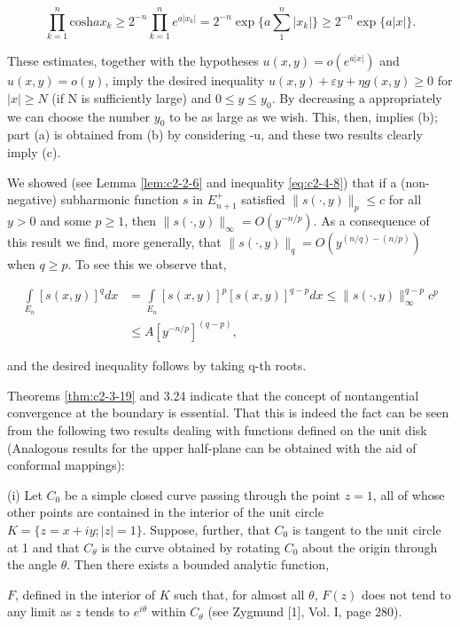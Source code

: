 \[
\prod_{k=1}^{n}\text{cosh}a x_{k}\geq2^{-n}\prod_{k=1}^{n}e^{a|x_{k}|}=2^{-n}\exp\bigg\{a\sum_{1}^{n}|x_{k}|\bigg\}\geq2^{-n}\exp\{a|x|\}.
\]

These estimates, together with the hypotheses $u(x, y) = o(e^{a|x|})$ and $u(x, y) = o(y)$, imply the desired inequality $u(x, y) + \varepsilon y + \eta g(x, y) \geq 0$ for $|x| \geq N$ (if N is sufficiently large) and $0 \leq y \leq y_0$. By decreasing a appropriately we can choose the number $y_0$ to be as large as we wish. This, then, implies (b); part (a) is obtained from (b) by considering -u, and these two results clearly imply (c).

 We showed (see Lemma \ref{lem:c2-2-6} and inequality \eqref{eq:c2-4-8}) that if a (non-negative) subharmonic function $s$ in $E_{n+1}^+$ satisfied $\|s(\cdot, y)\|_p \leq c$ for all $y > 0$ and some $p \geq 1$, then $\|s(\cdot, y)\|_{\infty} = O(y^{-n/p})$. As a consequence of this result we find, more generally, that $\|s(\cdot, y)\|_q = O(y^{(n/q) - (n/p)})$ when $q \geq p$. To see this we observe that,

\[
\begin{aligned}\int\limits_{E_{n}}[s(x,y)]^{q} dx&=\int\limits_{E_{n}}[s(x,y)]^{p}[s(x,y)]^{q-p}dx\leq\|s(\cdot,y)\|_{\infty}^{q-p}c^{p}\\&\leq A[y^{-n/p}]^{(q-p)},\end{aligned}
\]

and the desired inequality follows by taking q-th roots.

 Theorems \ref{thm:c2-3-19} and 3.24 indicate that the concept of nontangential convergence at the boundary is essential. That this is indeed the fact can be seen from the following two results dealing with functions defined on the unit disk (Analogous results for the upper half-plane can be obtained with the aid of conformal mappings):

(i) Let $C_0$ be a simple closed curve passing through the point $z = 1$, all of whose other points are contained in the interior of the unit circle $K = \{z = x + iy; |z| = 1\}$. Suppose, further, that $C_0$ is tangent to the unit circle at 1 and that $C_\theta$ is the curve obtained by rotating $C_0$ about the origin through the angle $\theta$. Then there exists a bounded analytic function,

$F$, defined in the interior of $K$ such that, for almost all $\theta$, $F(z)$ does not tend to any limit as $z$ tends to $e^{i\theta}$ within $C_\theta$ (see Zygmund [1], Vol. I, page 280).

